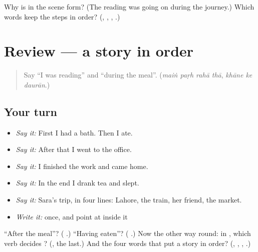 \begin{tcolorbox}[breakable,colback=teal!4,colframe=teal!35!black,title={Before you move on}]
Why is \textbf{  } in the scene form? (The reading was going on during the journey.) Which words keep the steps in order? (\textbf{}, \textbf{}, \textbf{ }, \textbf{ }.)
\end{tcolorbox}
\section[(review)]{Review — a story in order}

\label{lesson:UR-R267-a-story-in-order}



\begin{quote}
Say \textquotedblleft{}I was reading\textquotedblright{} and \textquotedblleft{}during the meal\textquotedblright{}. (\emph{maiṅ paṛh rahā thā}, \emph{khāne ke daurān}.)
\end{quote}

\subsection*{Your turn}
\begin{itemize}
\raggedright
  \item \emph{Say it:} First I had a bath. Then I ate.
  \item \emph{Say it:} After that I went to the office.
  \item \emph{Say it:} I finished the work and came home.
  \item \emph{Say it:} In the end I drank tea and slept.
  \item \emph{Say it:} Sara's trip, in four lines: Lahore, the train, her friend, the market.
  \item \emph{Write it:} \textbf{} once, and point at  inside it
\end{itemize}

\begin{tcolorbox}[breakable,colback=teal!4,colframe=teal!35!black,title={Before you move on}]
\textquotedblleft{}After the meal\textquotedblright{}? (\textbf{  }.) \textquotedblleft{}Having eaten\textquotedblright{}? (\textbf{ }.) Now the other way round: in \textbf{     }, which verb decides \textbf{}? (\textbf{}, the last.) And the four words that put a story in order? (\textbf{}, \textbf{}, \textbf{  }, \textbf{ }.)
\end{tcolorbox}
